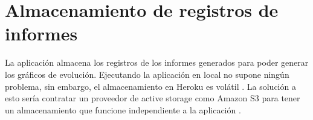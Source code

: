 \section{Almacenamiento de registros de informes}
La aplicación almacena los registros de los informes generados para poder generar los gráficos de evolución. Ejecutando la aplicación en local no supone ningún problema, sin embargo, el almacenamiento en Heroku es volátil \cite{ephemeralHeroku-2018}. La solución a esto sería contratar un proveedor de active storage como Amazon S3 para tener un almacenamiento que funcione independiente a la aplicación \cite{activeStorageOverview-2019}.
